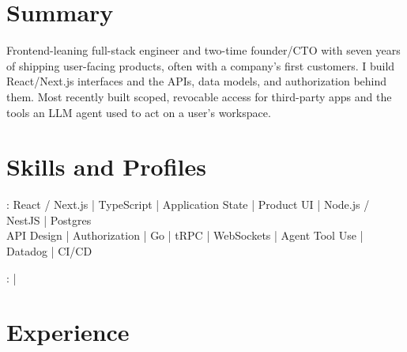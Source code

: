 \documentclass[print]{jack-resume}
\begin{document}
\pagecolor{darkmodeBackground}


\begin{minipage}[t][1cm][t]{.03\textwidth}
    \hfill
\end{minipage}

\section{Summary}
Frontend-leaning full-stack engineer and two-time founder/CTO with seven years of shipping user-facing products, often with a company's first customers. I build React/Next.js interfaces and the APIs, data models, and authorization behind them. Most recently built scoped, revocable access for third-party apps and the tools an LLM agent used to act on a user's workspace.
\sectionsep

\section{Skills and Profiles}
:
React / Next.js \hfill | \hfill
TypeScript \hfill | \hfill
Application State \hfill | \hfill
Product UI \hfill | \hfill
Node.js / NestJS \hfill | \hfill
Postgres \\
\hspace{1.0cm} API Design \hfill | \hfill
Authorization \hfill | \hfill
Go \hfill | \hfill
tRPC \hfill | \hfill
WebSockets \hfill | \hfill
Agent Tool Use \hfill | \hfill
Datadog \hfill | \hfill
CI/CD \\

\raggedright{
    :
      \href{https://www.linkedin.com/in/jack-sturtevant/}{ \ExternalLink} |
     \href{https://github.com/jacksturt}{ \ExternalLink}}

\section{Experience}
\end{document}
